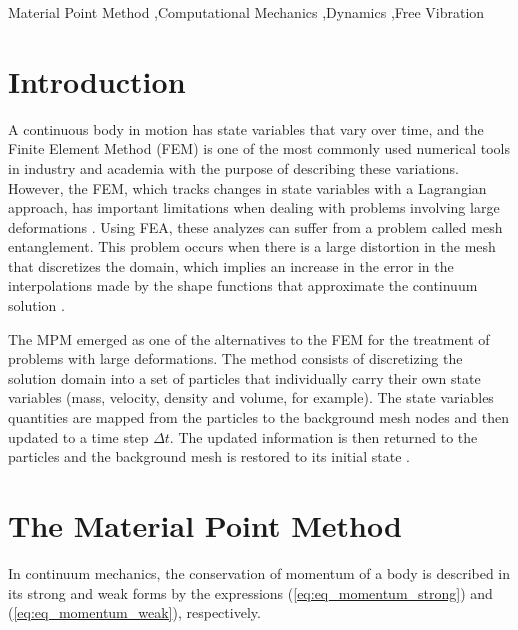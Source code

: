 \documentclass[preprint,12pt]{elsarticle}
\begin{document}
\begin{frontmatter}
		\begin{keyword}
			Material Point Method \sep Computational Mechanics \sep Dynamics \sep Free Vibration
		\end{keyword}
		
	\end{frontmatter}
	
	
	\section{Introduction}
	A continuous body in motion has state variables that vary over time, and the Finite Element Method (FEM) is one of the most commonly used numerical tools in industry and academia with the purpose of describing these variations. However, the FEM, which tracks changes in state variables with a Lagrangian approach, has important limitations when dealing with problems involving large deformations \cite{zhang_material_2017}. Using FEA, these analyzes can suffer from a problem called mesh entanglement. This problem occurs when there is a large distortion in the mesh that discretizes the domain, which implies an increase in the error in the interpolations made by the shape functions that approximate the continuum solution \cite{SINAIE2017}.

    The MPM emerged as one of the alternatives to the FEM for the treatment of problems with large deformations. The method consists of discretizing the solution domain into a set of particles that individually carry their own state variables (mass, velocity, density and volume, for example). The state variables quantities are mapped from the particles to the background mesh nodes and then updated to a time step $\Delta t$. The updated information is then returned to the particles and the background mesh is restored to its initial state \cite{zhang_material_2017}.
        
    

	\section{The Material Point Method}
	
    In continuum mechanics, the conservation of momentum of a body is described in its strong and weak forms by the expressions (\ref{eq:eq_momentum_strong}) and (\ref{eq:eq_momentum_weak}), respectively.
\end{document}

